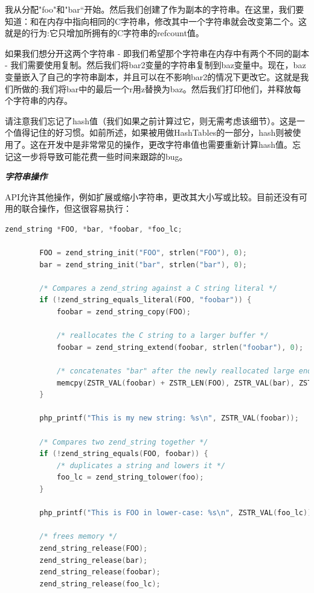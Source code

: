我从分配"foo"和"bar“开始。然后我们创建了作为副本的字符串。在这里，我们要知道：和在内存中指向相同的C字符串，修改其中一个字符串就会改变第二个。这就是的行为:它只增加所拥有的C字符串的refcount值。

如果我们想分开这两个字符串 - 即我们希望那个字符串在内存中有两个不同的副本 - 我们需要使用复制。然后我们将bar2变量的字符串复制到baz变量中。现在，baz变量嵌入了自己的字符串副本，并且可以在不影响bar2的情况下更改它。这就是我们所做的:我们将bar中的最后一个r用z替换为baz。然后我们打印他们，并释放每个字符串的内存。

请注意我们忘记了hash值（我们如果之前计算过它，则无需考虑该细节）。这是一个值得记住的好习惯。如前所述，如果被用做HashTables的一部分，hash则被使用了。这在开发中是非常常见的操作，更改字符串值也需要重新计算hash值。忘记这一步将导致可能花费一些时间来跟踪的bug。

\textbf{\textit{字符串操作}}

 API允许其他操作，例如扩展或缩小字符串，更改其大小写或比较。目前还没有可用的联合操作，但这很容易执行：

\begin{lstlisting}[language=c]
        zend_string *FOO, *bar, *foobar, *foo_lc;

        FOO = zend_string_init("FOO", strlen("FOO"), 0);
        bar = zend_string_init("bar", strlen("bar"), 0);
        
        /* Compares a zend_string against a C string literal */
        if (!zend_string_equals_literal(FOO, "foobar")) {
            foobar = zend_string_copy(FOO);
        
            /* reallocates the C string to a larger buffer */
            foobar = zend_string_extend(foobar, strlen("foobar"), 0);
        
            /* concatenates "bar" after the newly reallocated large enough "FOO" */
            memcpy(ZSTR_VAL(foobar) + ZSTR_LEN(FOO), ZSTR_VAL(bar), ZSTR_LEN(bar));
        }
        
        php_printf("This is my new string: %s\n", ZSTR_VAL(foobar));
        
        /* Compares two zend_string together */
        if (!zend_string_equals(FOO, foobar)) {
            /* duplicates a string and lowers it */
            foo_lc = zend_string_tolower(foo);
        }
        
        php_printf("This is FOO in lower-case: %s\n", ZSTR_VAL(foo_lc));
        
        /* frees memory */
        zend_string_release(FOO);
        zend_string_release(bar);
        zend_string_release(foobar);
        zend_string_release(foo_lc);
\end{lstlisting}  

